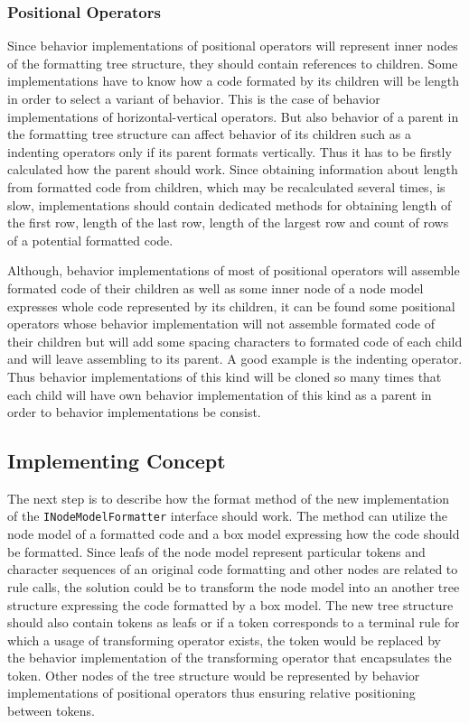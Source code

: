 \documentclass[12pt,notitlepage,a4paper]{report}
\begin{document}
\subsubsection{Positional Operators}
Since behavior implementations of positional operators will represent inner nodes of the formatting tree structure, they should contain references to children. Some implementations have to know how a code formated by its children will be length in order to select a variant of behavior. This is the case of behavior implementations of horizontal-vertical operators. But also behavior of a parent in the formatting tree structure can affect behavior of its children such as a indenting operators only if its parent formats vertically. Thus it has to be firstly calculated how the parent should work. Since obtaining information about length from formatted code from children, which may be recalculated several times, is slow, implementations should contain dedicated methods for obtaining  length of the first row, length of the last row, length of the largest row and count of rows of a potential formatted code.


Although, behavior implementations of most of positional operators will assemble formated code of their children as well as some inner node of a node model expresses whole code represented by its children, it can be found some positional operators whose behavior implementation will not assemble formated code of their children but will add some spacing characters to formated code of each child and will leave assembling to its parent. A good example is the indenting operator. Thus behavior implementations of this kind will be cloned so many times that each child will have own behavior implementation of this kind as a parent in order to behavior implementations be consist.


\subsection{Implementing Concept}
The next step is to describe how the format method of the new implementation of the \texttt{INodeModelFormatter} interface should work. The method can utilize the node model of a formatted code and  a box model expressing how the code should be formatted. Since leafs of the node model represent particular tokens and character sequences of an original code formatting and other nodes are related to rule calls, the solution could be to transform the node model into an another tree structure expressing the code formatted by a box model. The new tree structure  should also contain tokens as leafs or if a token corresponds to a terminal rule for which a usage of transforming operator exists, the token would be replaced by the behavior implementation of the transforming operator that encapsulates the token. Other nodes of the tree structure would be represented by behavior implementations of positional operators thus ensuring relative positioning between tokens. 
\end{document}
